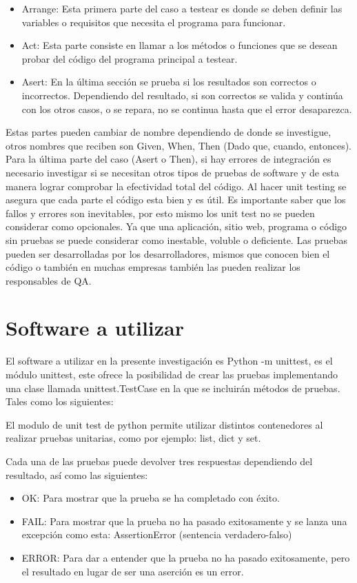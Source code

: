 \documentclass[conference]{IEEEtran}
\begin{document}
\begin{itemize}
\item Arrange: Esta primera parte del caso a testear es donde se deben definir las variables o requisitos que necesita el programa para funcionar.
\item Act: Esta parte consiste en llamar a los métodos o funciones que se desean probar del código del programa principal a testear. 
\item Asert: En la última sección se prueba si los resultados son correctos o incorrectos. Dependiendo del resultado, si son correctos se valida y continúa con los otros casos, o se repara, no se continua hasta que el error desaparezca.
\end{itemize}

Estas partes pueden cambiar de nombre dependiendo de donde se investigue, otros nombres que reciben son Given, When, Then (Dado que, cuando, entonces).
Para la última parte del caso (Asert o Then), si hay errores de integración es necesario investigar si se necesitan otros tipos de pruebas de software y de esta manera lograr comprobar la efectividad total del código.
Al hacer unit testing se asegura que cada parte el código esta bien y es útil. Es importante saber que los fallos y errores son inevitables, por esto mismo los unit test no se pueden considerar como opcionales. Ya que una aplicación, sitio web, programa o código sin pruebas se puede considerar como inestable, voluble o deficiente.
Las pruebas pueden ser desarrolladas por los desarrolladores, mismos que conocen bien el código o también en muchas empresas también las pueden realizar los responsables de QA.

\section{Software a utilizar}

El software a utilizar en la presente investigación es Python -m unittest, es el módulo unittest, este ofrece la posibilidad de crear las pruebas implementando una clase llamada unittest.TestCase en la que se incluirán métodos de pruebas. Tales como los siguientes: 

El modulo de unit test de python permite utilizar distintos contenedores al realizar pruebas unitarias, como por ejemplo: list, dict y set.

Cada una de las pruebas puede devolver tres respuestas dependiendo del resultado, así como las siguientes:

\begin{itemize}
\item OK: Para mostrar que la prueba se ha completado con éxito.
\item FAIL: Para mostrar que la prueba no ha pasado exitosamente y se lanza una excepción como esta: AssertionError (sentencia verdadero-falso)
\item ERROR: Para dar a entender que la prueba no ha pasado exitosamente, pero el resultado en lugar de ser una aserción es un error.
\end{itemize}
\end{document}

